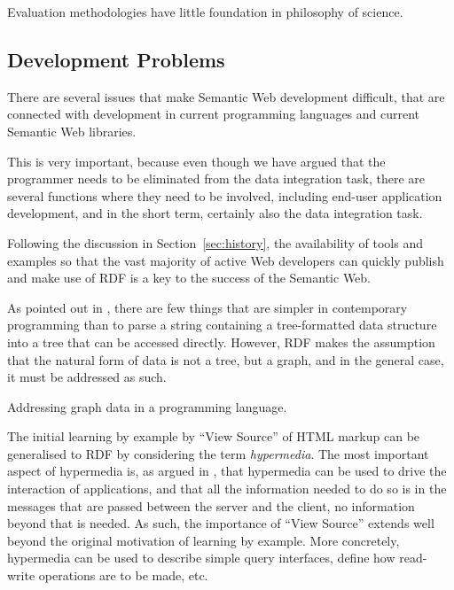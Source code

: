 \begin{problem}\label{prob:badphil}
Evaluation methodologies have little foundation in philosophy of science.
\end{problem}


\subsection{Development Problems}\label{sec:devproblems}

There are several issues that make Semantic Web development difficult,
that are connected with development in current programming languages
and current Semantic Web libraries.

This is very important, because even though we have argued that the
programmer needs to be eliminated from the data integration task,
there are several functions where they need to be involved, including
end-user application development, and in the short term, certainly
also the data integration task. 

Following the discussion in Section~\ref{sec:history}, the
availability of tools and examples so that the vast majority of active
Web developers can quickly publish and make use of RDF is a key to the
success of the Semantic Web.

As pointed out in \cite{darobin1}, there are few things that are
simpler in contemporary programming than to parse a string containing
a tree-formatted data structure into a tree that can be accessed
directly. However, RDF makes the assumption that the natural form of
data is not a tree, but a graph, and in the general case, it must be
addressed as such.

\begin{problem}\label{prob:graph}
Addressing graph data in a programming language.
\end{problem}

The initial learning by example by ``View Source'' of HTML markup can
be generalised to RDF by considering the term \emph{hypermedia}. The
most important aspect of hypermedia is, as argued in
\cite{Fielding_2000_Architectural-Styles}, that hypermedia can be used
to drive the interaction of applications, and that all the information
needed to do so is in the messages that are passed between the server
and the client, no information beyond that is needed. As such, the
importance of ``View Source'' extends well beyond the original
motivation of learning by example. More concretely, hypermedia can be
used to describe simple query interfaces, define how read-write
operations are to be made, etc.

